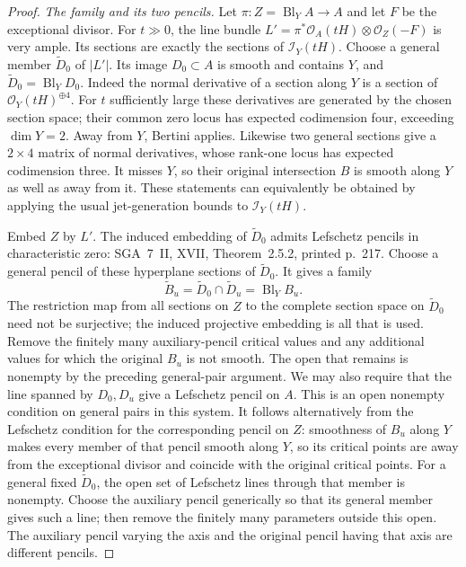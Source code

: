 \documentclass[11pt]{article}
\theoremstyle{remark}\newtheorem{remark}[theorem]{Remark}
\begin{document}
\begin{proof}
\emph{The family and its two pencils.}
Let $\pi:Z=\operatorname{Bl}_Y A\to A$ and let $F$ be the exceptional
divisor. For $t\gg0$, the line bundle
$L'=\pi^*\mathcal O_A(tH)\otimes\mathcal O_Z(-F)$ is very ample.
Its sections are exactly the sections of $\mathcal I_Y(tH)$.
Choose a general member $\widetilde D_0$ of $|L'|$.
Its image $D_0\subset A$ is smooth and contains $Y$, and
$\widetilde D_0=\operatorname{Bl}_Y D_0$.
Indeed the normal derivative of a section along $Y$ is a section
of $\mathcal O_Y(tH)^{\oplus4}$. For $t$ sufficiently large these
derivatives are generated by the chosen section space; their common
zero locus has expected codimension four, exceeding $\dim Y=2$.
Away from $Y$, Bertini applies. Likewise two general sections give
a $2\times4$ matrix of normal derivatives, whose rank-one locus
has expected codimension three. It misses $Y$, so their original
intersection $B$ is smooth along $Y$ as well as away from it.
These statements can equivalently be obtained by applying the
usual jet-generation bounds to $\mathcal I_Y(tH)$.

Embed $Z$ by $L'$. The induced embedding of $\widetilde D_0$ admits
Lefschetz pencils in characteristic zero: SGA~7~II, XVII,
Theorem~2.5.2, printed p.~217. Choose a general pencil of these
hyperplane sections of $\widetilde D_0$. It gives a family
\[
 \widetilde B_u=\widetilde D_0\cap\widetilde D_u
                  =\operatorname{Bl}_Y B_u.
 \tag{A13.5}
\]
The restriction map from all sections on $Z$ to the complete
section space on $\widetilde D_0$ need not be surjective; the
induced projective embedding is all that is used.
Remove the finitely many auxiliary-pencil critical values and
any additional values for which the original $B_u$ is not smooth.
The open that remains is nonempty by the preceding general-pair
argument. We may also require that the line spanned by
$D_0,D_u$ give a Lefschetz pencil on $A$. This is an open nonempty
condition on general pairs in this system. It follows alternatively
from the Lefschetz condition for the corresponding pencil on $Z$:
smoothness of $B_u$ along $Y$ makes every member of that pencil
smooth along $Y$, so its critical points are away from the
exceptional divisor and coincide with the original critical points.
For a general fixed $\widetilde D_0$, the open set of Lefschetz
lines through that member is nonempty. Choose the auxiliary
pencil generically so that its general member gives such a line;
then remove the finitely many parameters outside this open.
The auxiliary pencil varying the axis and the original pencil
having that axis are different pencils.


\end{proof}
\end{document}
